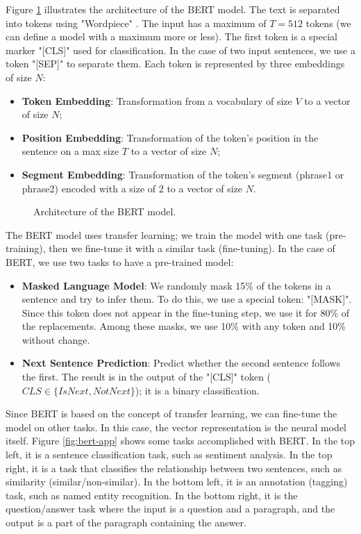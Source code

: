 \documentclass{KBook}
\begin{document}
Figure \ref{fig:bert-arch} illustrates the architecture of the BERT model.
The text is separated into tokens using "Wordpiece" \cite{2016-wu-al}.
The input has a maximum of $T = 512$ tokens (we can define a model with a maximum more or less).
The first token is a special marker "[CLS]" used for classification.
In the case of two input sentences, we use a token "[SEP]" to separate them.
Each token is represented by three embeddings of size $N$:
\begin{itemize}
	\item \textbf{Token Embedding}: Transformation from a vocabulary of size $V$ to a vector of size $N$;
	\item \textbf{Position Embedding}: Transformation of the token's position in the sentence on a max size $T$ to a vector of size $N$;
	\item \textbf{Segment Embedding}: Transformation of the token's segment (phrase1 or phrase2) encoded with a size of $2$ to a vector of size $N$.
\end{itemize}

\begin{figure}[ht]
	\centering
	\caption{Architecture of the BERT model.}
	\label{fig:bert-arch}
\end{figure}

The BERT model uses transfer learning; we train the model with one task (pre-training), then we fine-tune it with a similar task (fine-tuning).
In the case of BERT, we use two tasks to have a pre-trained model:
\begin{itemize}
	\item \textbf{Masked Language Model}: We randomly mask 15\% of the tokens in a sentence and try to infer them. To do this, we use a special token: "[MASK]". Since this token does not appear in the fine-tuning step, we use it for 80\% of the replacements. Among these masks, we use 10\% with any token and 10\% without change.
	
	\item \textbf{Next Sentence Prediction}: Predict whether the second sentence follows the first. The result is in the output of the "[CLS]" token ($CLS \in \{IsNext, NotNext\}$); it is a binary classification.
\end{itemize}

Since BERT is based on the concept of transfer learning, we can fine-tune the model on other tasks. In this case, the vector representation is the neural model itself. Figure \ref{fig:bert-app} shows some tasks accomplished with BERT. In the top left, it is a sentence classification task, such as sentiment analysis. In the top right, it is a task that classifies the relationship between two sentences, such as similarity (similar/non-similar). In the bottom left, it is an annotation (tagging) task, such as named entity recognition. In the bottom right, it is the question/answer task where the input is a question and a paragraph, and the output is a part of the paragraph containing the answer.
\end{document}
